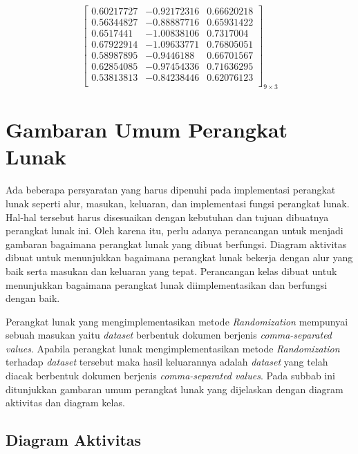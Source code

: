 \begin{enumerate}
\begin{equation}
\begin{bmatrix}
        0.60217727  & -0.92172316  &  0.66620218 \\
        0.56344827 &  -0.88887716  &  0.65931422 \\
        0.6517441   & -1.00838106  &  0.7317004  \\
        0.67922914  & -1.09633771  &  0.76805051 \\
        0.58987895  & -0.9446188   &  0.66701567 \\
        0.62854085  & -0.97454336  &  0.71636295 \\
        0.53813813  & -0.84238446  &  0.62076123 \\
        \end{bmatrix}_{9\times 3}
    \end{equation}
\end{enumerate}

\section{Gambaran Umum Perangkat Lunak}
\label{sec:gambaran-pl}

Ada beberapa persyaratan yang harus dipenuhi pada implementasi perangkat lunak seperti alur, masukan, keluaran, dan implementasi fungsi perangkat lunak. Hal-hal tersebut harus disesuaikan dengan kebutuhan dan tujuan dibuatnya perangkat lunak ini. Oleh karena itu, perlu adanya perancangan untuk menjadi gambaran bagaimana perangkat lunak yang dibuat berfungsi. Diagram aktivitas dibuat untuk menunjukkan bagaimana perangkat lunak bekerja dengan alur yang baik serta masukan dan keluaran yang tepat. Perancangan kelas dibuat untuk menunjukkan bagaimana perangkat lunak diimplementasikan dan berfungsi dengan baik.

Perangkat lunak yang mengimplementasikan metode \textit{Randomization} mempunyai sebuah masukan yaitu \textit{dataset} berbentuk dokumen berjenis \textit{comma-separated values}. Apabila perangkat lunak mengimplementasikan metode \textit{Randomization} terhadap \textit{dataset} tersebut maka hasil keluarannya adalah \textit{dataset} yang telah diacak berbentuk dokumen berjenis \textit{comma-separated values}. Pada subbab ini ditunjukkan gambaran umum perangkat lunak yang dijelaskan dengan diagram aktivitas dan diagram kelas.

\subsection{Diagram Aktivitas}
\label{subsec:diagram-aktivitas}

